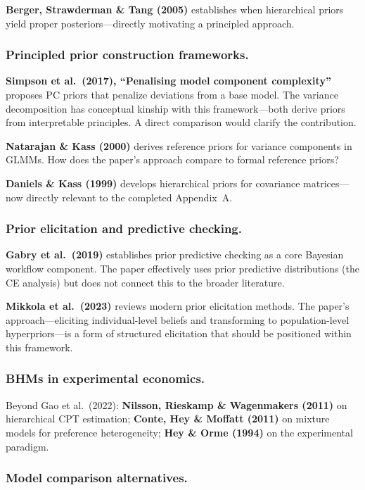 \documentclass[12pt,a4paper]{article}
\begin{document}
\textbf{Berger, Strawderman \& Tang (2005)} establishes when hierarchical
priors yield proper posteriors---directly motivating a principled approach.

\subsubsection{Principled prior construction frameworks.}

\textbf{Simpson et al.\ (2017), ``Penalising model component complexity''}
proposes PC priors that penalize deviations from a base model.  The variance
decomposition has conceptual kinship with this framework---both derive priors
from interpretable principles.  A direct comparison would clarify the
contribution.

\textbf{Natarajan \& Kass (2000)} derives reference priors for variance
components in GLMMs.  How does the paper's approach compare to formal reference
priors?

\textbf{Daniels \& Kass (1999)} develops hierarchical priors for covariance
matrices---now directly relevant to the completed Appendix~A.

\subsubsection{Prior elicitation and predictive checking.}

\textbf{Gabry et al.\ (2019)} establishes prior predictive checking as a core
Bayesian workflow component.  The paper effectively uses prior predictive
distributions (the CE analysis) but does not connect this to the broader
literature.

\textbf{Mikkola et al.\ (2023)} reviews modern prior elicitation methods.  The
paper's approach---eliciting individual-level beliefs and transforming to
population-level hyperpriors---is a form of structured elicitation that should
be positioned within this framework.

\subsubsection{BHMs in experimental economics.}

Beyond Gao et al.\ (2022): \textbf{Nilsson, Rieskamp \& Wagenmakers (2011)} on
hierarchical CPT estimation; \textbf{Conte, Hey \& Moffatt (2011)} on mixture
models for preference heterogeneity; \textbf{Hey \& Orme (1994)} on the
experimental paradigm.

\subsubsection{Model comparison alternatives.}
\end{document}
